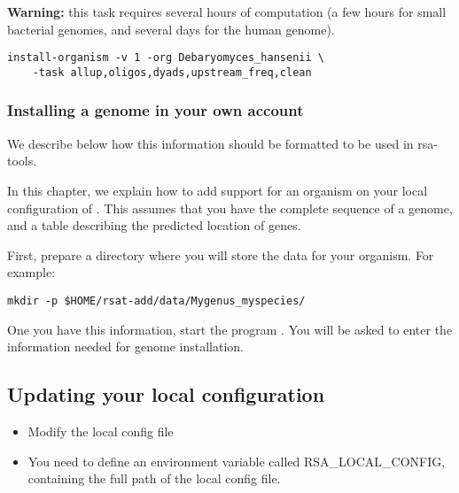 \textbf{Warning: } this task requires several hours of computation (a
few hours for small bacterial genomes, and several days for the human
genome).

\begin{verbatim}
install-organism -v 1 -org Debaryomyces_hansenii \
    -task allup,oligos,dyads,upstream_freq,clean
\end{verbatim}

\subsubsection{Installing a genome in your own account}

We describe below how this information should be formatted to be used
in rsa-tools.

In this chapter, we explain how to add support for an organism on your
local configuration of \RSAT. This assumes that you have the complete
sequence of a genome, and a table describing the predicted location of
genes.

First, prepare a directory where you will store the data for your
organism. For example:

\begin{verbatim}
mkdir -p $HOME/rsat-add/data/Mygenus_myspecies/
\end{verbatim}


One you have this information, start the program
. You will be asked to enter the information
needed for genome installation.

\subsection{Updating your local configuration}


\begin{itemize}
\item Modify the local config file

\item You need to define an environment variable called
  RSA\_LOCAL\_CONFIG, containing the full path of the local config
  file.

\end{itemize}
